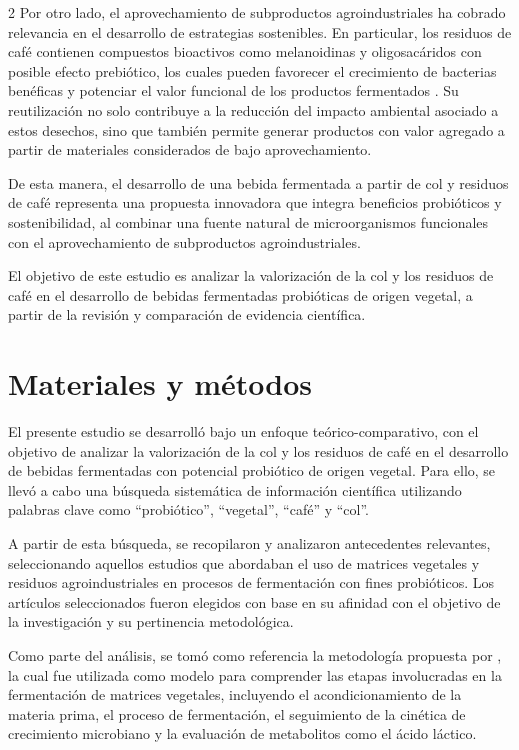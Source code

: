 \begin{multicols}{2}
Por otro lado, el aprovechamiento de subproductos agroindustriales ha cobrado relevancia en el desarrollo de estrategias sostenibles. En particular, los residuos de café contienen compuestos bioactivos como melanoidinas y oligosacáridos con posible efecto prebiótico, los cuales pueden favorecer el crecimiento de bacterias benéficas y potenciar el valor funcional de los productos fermentados \citep{esquiveljimenez2012}. Su reutilización no solo contribuye a la reducción del impacto ambiental asociado a estos desechos, sino que también permite generar productos con valor agregado a partir de materiales considerados de bajo aprovechamiento.

De esta manera, el desarrollo de una bebida fermentada a partir de col y residuos de café representa una propuesta innovadora que integra beneficios probióticos y sostenibilidad, al combinar una fuente natural de microorganismos funcionales con el aprovechamiento de subproductos agroindustriales.

El objetivo de este estudio es analizar la valorización de la col y los residuos de café en el desarrollo de bebidas fermentadas probióticas de origen vegetal, a partir de la revisión y comparación de evidencia científica.  

\section{Materiales y métodos}

El presente estudio se desarrolló bajo un enfoque teórico-comparativo, con el objetivo de analizar la valorización de la col y los residuos de café en el desarrollo de bebidas fermentadas con potencial probiótico de origen vegetal. Para ello, se llevó a cabo una búsqueda sistemática de información científica utilizando palabras clave como “probiótico”, “vegetal”, “café” y “col”. 

A partir de esta búsqueda, se recopilaron y analizaron antecedentes relevantes, seleccionando aquellos estudios que abordaban el uso de matrices vegetales y residuos agroindustriales en procesos de fermentación con fines probióticos. Los artículos seleccionados fueron elegidos con base en su afinidad con el objetivo de la investigación y su pertinencia metodológica. 

Como parte del análisis, se tomó como referencia la metodología propuesta por \citet{guajardobarbosa2024}, la cual fue utilizada como modelo para comprender las etapas involucradas en la fermentación de matrices vegetales, incluyendo el acondicionamiento de la materia prima, el proceso de fermentación, el seguimiento de la cinética de crecimiento microbiano y la evaluación de metabolitos como el ácido láctico.


\end{multicols}
